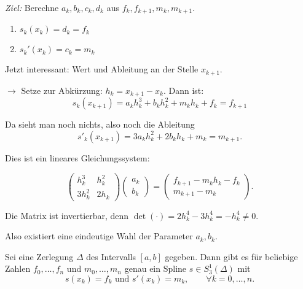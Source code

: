 \emph{Ziel:} Berechne $a_k, b_k, c_k, d_k$ aus $f_k, f_{k+1}, m_k, m_{k+1}$.
\begin{enumerate}
  \item $s_k(x_k)=d_k = f_k$
  \item $s_k'(x_k) = c_k = m_k$
\end{enumerate}

\medskip

Jetzt interessant: Wert und Ableitung an der Stelle $x_{k+1}$.

\medskip

$\rightarrow$ Setze zur Abkürzung: $h_k = x_{k+1} - x_k$.
Dann ist:
\begin{equation*}
 s_k(x_{k+1}) = a_k h_k^3 + b_k h_k^2 + m_k h_k + f_k = f_{k+1}
\end{equation*}

Da sieht man noch nichts, also noch die Ableitung
\begin{equation*}
 s'_{k}(x_{k+1}) = 3a_kh_k^2 + 2b_k h_k + m_k = m_{k+1}.
\end{equation*}

Dies ist ein lineares Gleichungssystem:

\begin{equation*}
\begin{pmatrix}
h_k^3 & h_k^2 \\
3h_k^2 & 2h_k
\end{pmatrix} 
\begin{pmatrix}
a_k \\
b_k
\end{pmatrix} = 
\begin{pmatrix}
f_{k+1} - m_kh_k - f_k\\
m_{k+1} - m_k
\end{pmatrix}.
\end{equation*}

Die Matrix ist invertierbar, denn $\det(\cdot) = 2h_k^4 - 3h_k^4 = -h_k^4 \neq 0$.

\medskip

Also existiert eine eindeutige Wahl der Parameter $a_k, b_k$.

\begin{satz}
  Sei eine Zerlegung $\Delta$ des Intervalls $\left[a, b\right]$ gegeben.
  Dann gibt es für beliebige Zahlen $f_0, \dots, f_n$ und $m_0, \dots, m_n$ genau ein Spline $s\in S^1_3(\Delta)$ mit
 \begin{equation*}
  s(x_k) = f_k \text{ und } s'(x_k) = m_k,
  \qquad
  \forall k =0, \dots, n.
 \end{equation*}
\end{satz}

